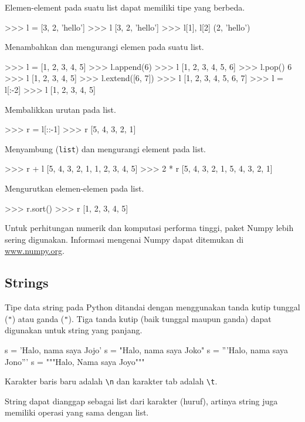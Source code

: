 Elemen-element pada suatu list dapat memiliki tipe yang berbeda.
\begin{pyconcode}
>>> l = [3, 2, 'hello']
>>> l
[3, 2, 'hello']
>>> l[1], l[2]
(2, 'hello')
\end{pyconcode}

Menambahkan dan mengurangi elemen pada suatu list.
\begin{pyconcode}
>>> l = [1, 2, 3, 4, 5]
>>> l.append(6)
>>> l
[1, 2, 3, 4, 5, 6]
>>> l.pop()
6
>>> l
[1, 2, 3, 4, 5]
>>> l.extend([6, 7])
>>> l
[1, 2, 3, 4, 5, 6, 7]
>>> l = l[:-2]
>>> l
[1, 2, 3, 4, 5]
\end{pyconcode}

Membalikkan urutan pada list.
\begin{pyconcode}
>>> r = l[::-1]
>>> r
[5, 4, 3, 2, 1]
\end{pyconcode}

Menyambung (\texttt{list}) dan mengurangi element pada list.
\begin{pyconcode}
>>> r + l
[5, 4, 3, 2, 1, 1, 2, 3, 4, 5]
>>> 2 * r
[5, 4, 3, 2, 1, 5, 4, 3, 2, 1]
\end{pyconcode}

Mengurutkan elemen-elemen pada list.
\begin{pyconcode}
>>> r.sort()
>>> r
[1, 2, 3, 4, 5]
\end{pyconcode}


Untuk perhitungan numerik dan komputasi performa tinggi, paket
\textsf{Numpy} lebih sering digunakan. Informasi mengenai \textsf{Numpy}
dapat ditemukan di \url{www.numpy.org}.


\subsection{Strings}

Tipe data string pada Python ditandai dengan menggunakan tanda
kutip tunggal (\texttt{"}) atau ganda (\texttt{"}). Tiga tanda kutip
(baik tunggal maupun ganda) dapat digunakan untuk string yang panjang.
\begin{pythoncode}
s = 'Halo, nama saya Jojo'
s = "Halo, nama saya Joko"
s = '''Halo, 
       nama saya Jono'''
s = """Halo,
   Nama saya Joyo"""
\end{pythoncode}

Karakter baris baru adalah \verb|\n| dan karakter tab adalah \verb|\t|.

String dapat dianggap sebagai list dari karakter (huruf), artinya string
juga memiliki operasi yang sama dengan list.

